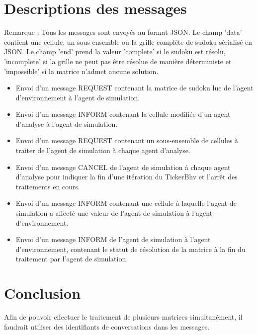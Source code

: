 \documentclass[a4paper,11pt]{article}
\begin{document}
\section{Descriptions des messages}
\begin{framed}
Remarque : Tous les messages sont envoyés au format JSON. Le champ 'data' contient une cellule, un sous-ensemble ou la grille complète de sudoku sérialisé en JSON. Le champ 'end' prend la valeur 'complete' si le sudoku est résolu, 'incomplete' si la grille ne peut pas être résolue de manière déterministe et 'impossible' si la matrice n'admet aucune solution.
\end{framed}
\begin{itemize}
\item Envoi d'un message REQUEST contenant la matrice de sudoku lue de l'agent d'environnement à l'agent de simulation.
\item Envoi d'un message INFORM contenant la cellule modifiée d'un agent d'analyse à l'agent de simulation.
\item Envoi d'un message REQUEST contenant un sous-ensemble de cellules à traiter de l'agent de simulation à chaque agent d'analyse.
\item Envoi d'un message CANCEL de l'agent de simulation à chaque agent d'analyse pour indiquer la fin d'une itération du TickerBhv et l'arrêt des traitements en cours.
\item Envoi d'un message INFORM contenant une cellule à laquelle l'agent de simulation a affecté une valeur de l'agent de simulation à l'agent d'environnement.
\item Envoi d'un message INFORM de l'agent de simulation à l'agent d'environnement, contenant le statut de résolution de la matrice à la fin du traitement par l'agent de simulation.
\end{itemize}

\section{Conclusion}
Afin de pouvoir effectuer le traitement de plusieurs matrices simultanément, il faudrait utiliser des identifiants de conversations dans les messages. 


\end{document}

